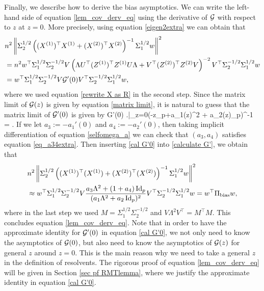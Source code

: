 \medskip
{} Finally, we describe how to derive the bias asymptotics. We can write the left-hand side of equation \eqref{lem_cov_derv_eq} using the derivative of $\cal G$ with respect to $z$ at $z=0$. More precisely, using equation \eqref{eigen2extra} we can obtain that
\begin{align}
&n^2\bignorm{\Sigma_2^{1/2} \bigbrace{ (X^{(1)})^{\top}X^{(1)} + (X^{(2)})^{\top}X^{(2)} }^{-1} \Sigma_1^{1/2} w}^2 \nonumber\\
&=n^2 w^\top \Sigma_1^{1/2}\Sigma_2^{-1/2}V\left(   \Lambda U^\top (Z^{(1)})^\top Z^{(1)} U\Lambda  + V^\top (Z^{(2)})^\top Z^{(2)}V\right)^{-2}V^\top\Sigma_2^{-1/2}\Sigma_1^{1/2}w \nonumber\\
&=  w^\top \Sigma_1^{1/2}\Sigma_2^{-1/2}V\cal G'(0)V^\top\Sigma_2^{-1/2}\Sigma_1^{1/2}w,\label{calculate G'}
\end{align}
where we used equation \eqref{rewrite X as R} in the second step. Since the matrix limit of $\cal G(z)$ is given by equation \eqref{matrix limit}, it is natural to guess that the matrix limit of $\cal G'(0)$ is given by
\be\label{cal G'0}\cal G'(0) \approx \left.\right|_{z=0}(-z\id_p+a_{1}(z)\Lambda^2 + a_{2}(z)\id_p)^{-1} = .\ee
If we let $a_3:=-a_1'(0)$ and $a_4:=-a_2'(0)$, then taking implicit differentiation of equation \eqref{selfomega_a} we can check that $(a_3,a_4)$ satisfies equation \eqref{eq_a34extra}. Then inserting \eqref{cal G'0} into \eqref{calculate G'}, we obtain that
\begin{align}
& n^2\bignorm{\Sigma_2^{1/2} \bigbrace{ (X^{(1)})^{\top}(X^{(1)}) + (X^{(2)})^{\top}(X^{(2)}) }^{-1} \Sigma_1^{1/2} w}^2 \nonumber\\
&\approx  w^\top \Sigma_1^{1/2}\Sigma_2^{-1/2}V\frac{a_3\Lambda^2 +(1+ a_4)\id_p}{(a_{1}\Lambda^2 + a_{2}\id_p)^2}V^\top \Sigma_2^{-1/2}\Sigma_1^{1/2}w= w^{\top} \Pi_\bias w, \label{calculatePibias}
\end{align}
where in the last step we used $M = \Sigma_1^{1/2}\Sigma_2^{-1/2}$ and $V \Lambda^2 V^\top=M^\top M$. This concludes equation \eqref{lem_cov_derv_eq}.
Note that in order to have the approximate identity for $\cal G'(0)$ in equation \eqref{cal G'0}, we not only need to know the asymptotics of $\cal G(0)$, but also need to know the asymptotics of $\cal G(z)$ for general $z$ around $z=0$. This is the main reason why we need to take a general $z$ in the definition of resolvents. The rigorous proof of equation \eqref{lem_cov_derv_eq} will be given in Section \ref{sec pf RMTlemma}, where we justify the approximate identity in equation \eqref{cal G'0}.

